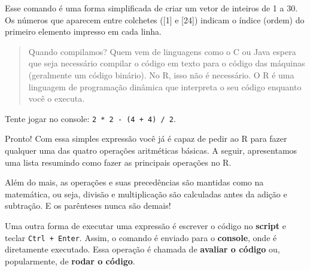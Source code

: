 \documentclass[
]{book}
\newenvironment{Shaded}{\begin{snugshade}}{\end{snugshade}}
\newcommand{\CommentTok}[1]{\textcolor[rgb]{0.56,0.35,0.01}{\textit{#1}}}
\newcommand{\DecValTok}[1]{\textcolor[rgb]{0.00,0.00,0.81}{#1}}
\newcommand{\OperatorTok}[1]{\textcolor[rgb]{0.81,0.36,0.00}{\textbf{#1}}}
\newcommand{\StringTok}[1]{\textcolor[rgb]{0.31,0.60,0.02}{#1}}
\begin{document}
Esse comando é uma forma simplificada de criar um vetor de inteiros de 1 a 30.
Os números que aparecem entre colchetes ({[}1{]} e {[}24{]}) indicam o índice (ordem) do primeiro elemento impresso em cada linha.

\begin{quote}
Quando compilamos? Quem vem de linguagens como o C ou Java espera que seja necessário compilar o código em texto para o código das máquinas (geralmente um código binário). No R, isso não é necessário. O R é uma linguagem de programação dinâmica que interpreta o seu código enquanto você o executa.
\end{quote}

Tente jogar no console: \texttt{2\ *\ 2\ -\ (4\ +\ 4)\ /\ 2}.

Pronto! Com essa simples expressão você já é capaz de pedir ao R para fazer qualquer uma das quatro operações aritméticas básicas. A seguir, apresentamos uma lista resumindo como fazer as principais operações no R.

\begin{Shaded}
\end{Shaded}

Além do mais, as operações e suas precedências são mantidas como na matemática, ou seja, divisão e multiplicação são calculadas antes da adição e subtração. E os parênteses nunca são demais!

Uma outra forma de executar uma expressão é escrever o código no \textbf{script} e teclar \texttt{Ctrl\ +\ Enter}. Assim, o comando é enviado para o \textbf{console}, onde é diretamente executado. Essa operação é chamada de \textbf{avaliar o código} ou, popularmente, de \textbf{rodar o código}.
\end{document}

